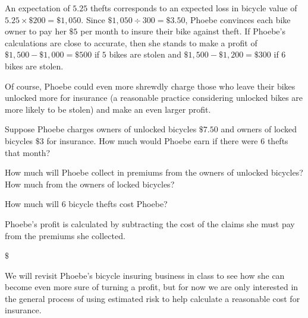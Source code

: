 \documentclass{ximera}
\begin{document}
An expectation of $5.25$ thefts corresponds to an expected loss in bicycle value of $5.25\times\$200=\$1,050$. Since $\$1,050\div 300=\$3.50$, Phoebe convinces each bike owner to pay her $\$5$ per month to insure their bike against theft. If Phoebe's calculations are close to accurate, then she stands to make a profit of $\$1,500-\$1,000=\$500$ if $5$ bikes are stolen and $\$1,500-\$1,200=\$300$ if $6$ bikes are stolen.

Of course, Phoebe could even more shrewdly charge those who leave their bikes unlocked more for insurance (a reasonable practice considering unlocked bikes are more likely to be stolen) and make an even larger profit.


\begin{question}
Suppose Phoebe charges owners of unlocked bicycles $\$7.50$ and owners of locked bicycles $\$3$ for insurance. How much would Phoebe earn if there were $6$ thefts that month?

\begin{hint}
How much will Phoebe collect in premiums from the owners of unlocked bicycles? How much from the owners of locked bicycles?
\end{hint}
\begin{hint}
How much will $6$ bicycle thefts cost Phoebe?
\end{hint}
\begin{hint}
Phoebe's profit is calculated by subtracting the cost of the claims she must pay from the premiums she collected.
\end{hint}
$\$$

\end{question}

We will revisit Phoebe's bicycle insuring business in class to see how she can become even more sure of turning a profit, but for now we are only interested in the general process of using estimated risk to help calculate a reasonable cost for insurance.
\end{document}
